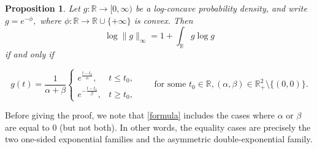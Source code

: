 \documentclass{article}
\theoremstyle{plain}
\newtheorem{proposition}[theorem]{Proposition}
\theoremstyle{definition}
\newcommand{\1}{\mathbf 1}
\begin{document}
\begin{proposition}
\label{prop:fradelizi-equality-1d}
Let $g:\mathbb R\to[0,\infty)$ be a log-concave probability density, and write
$g=e^{-\phi},$ where $\phi:\mathbb R\to \mathbb R\cup\{+\infty\}$ is convex.
Then
\[
\log\|g\|_\infty = 1+\int_{\mathbb R} g\log g
\]
if and only if

\begin{equation} \label{formula}
g(t)=\frac{1}{\alpha+\beta}
\begin{cases}
e^{\frac{t-t_0}{\alpha}}, & t\le t_0,\\[1mm]
e^{-\frac{t-t_0}{\beta}}, & t\ge t_0,
\end{cases}
\qquad\text{for some }t_0 \in \mathbb R, (\alpha, \beta) \in \mathbb R_+^2 \setminus \{(0,0)\}.
\end{equation}
\end{proposition}
Before giving the proof, we note that \eqref{formula} includes the cases where $\alpha$ or $\beta$ are equal to $0$ (but not both). In other words, the equality cases are precisely the two one-sided exponential
families and the asymmetric double-exponential family.
\end{document}
